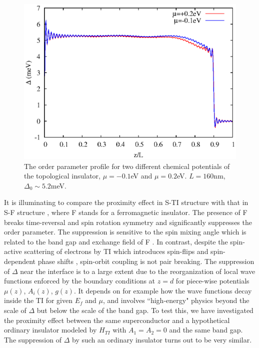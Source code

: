 \begin{figure}
\center
\includegraphics[width=\textwidth]{include/dtchemi.eps}
\caption{The order parameter profile for two different chemical potentials of
the topological insulator, $\mu=-0.1$eV and $\mu=0.2$eV. $L=160$nm,  
$\Delta_0\sim 5.2$meV. }\label{delta-chem}
\end{figure}

It is illuminating to compare the proximity effect in S-TI
structure with that in S-F structure \cite{toku}, where F stands for 
a ferromagnetic insulator. 
The presence of F breaks time-reversal and spin rotation symmetry and 
significantly suppresses the order parameter. The suppression is
sensitive to the spin mixing angle which is related to the band gap
and exchange field of F \cite{toku}.
In contrast, despite the spin-active scattering of electrons 
by TI which introduces spin-flips and spin-dependent phase shifts \cite{zhao}, 
spin-orbit coupling is not pair breaking.
%
The suppression of $\Delta$ near the interface is to a large extent 
due to the reorganization of local wave functions enforced by the boundary conditions 
at $z=d$ for piece-wise potentials $\mu(z)$, $A_i(z)$, $g(z)$. 
It depends on for example how the wave functions decay inside the TI
for given $E_f$ and $\mu$, and involves ``high-energy" physics beyond the
scale of $\Delta$ but below the scale of the band gap. 
%
To test this, we have investigated the proximity effect between the same
superconductor and
a hypothetical ordinary insulator modeled by $H_{TI}$ with $A_1=A_2=0$
and the same band gap. The suppression of $\Delta$ by such an 
ordinary insulator turns out to be very similar. 

